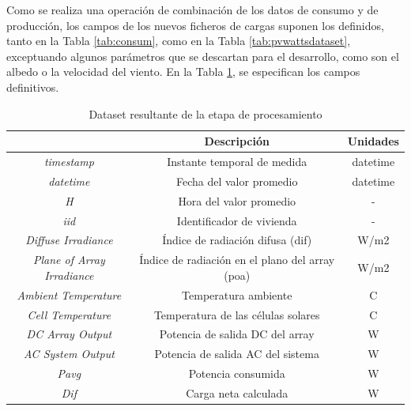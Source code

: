 \vspace{3mm}

Como se realiza una operación de combinación de los datos de consumo y de producción, los campos de los nuevos ficheros de cargas suponen los definidos, tanto en la Tabla \ref{tab:consum}, como en la Tabla \ref{tab:pvwattsdataset}, exceptuando algunos parámetros que se descartan para el desarrollo, como son el albedo o la velocidad del viento. En la Tabla \ref{tab:datacombinacion}, se especifican los campos definitivos.

\vspace{3mm}

\begin{table}[H]
  \centering
  \begin{tabular}{|c|c|c|}
  \hline
  \rowcolor[HTML]{AAAAAA} 
  \multicolumn{1}{|c|}{\cellcolor[HTML]{AAAAAA}Campo} & \multicolumn{1}{c|}{\cellcolor[HTML]{AAAAAA}Descripción} & Unidades \\ \hline
  \textit{timestamp} & Instante temporal de medida & datetime \\ \hline
  \textit{datetime} & Fecha del valor promedio & datetime \\ \hline
  \textit{H} & Hora del valor promedio & - \\ \hline
  \textit{iid} & Identificador de vivienda & - \\ \hline
  \textit{Diffuse Irradiance} & Índice de radiación difusa (\gls{dif}) & W/m2 \\ \hline
  \textit{Plane of Array Irradiance} & Índice de radiación en el plano del array (\acrshort{poa}) & W/m2 \\ \hline 
  \textit{Ambient Temperature} & Temperatura ambiente & C \\ \hline
  \textit{Cell Temperature} & Temperatura de las células solares & C \\ \hline
  \textit{DC Array Output} & Potencia de salida DC del array & W \\ \hline
  \textit{AC System Output} & Potencia de salida AC del sistema & W \\ \hline
  \textit{Pavg} & Potencia consumida & W \\ \hline
  \textit{Dif} & Carga neta calculada & W \\ \hline
  \end{tabular}
  \caption{Dataset resultante de la etapa de procesamiento}
  \label{tab:datacombinacion}
\end{table}

\vspace{3mm}

